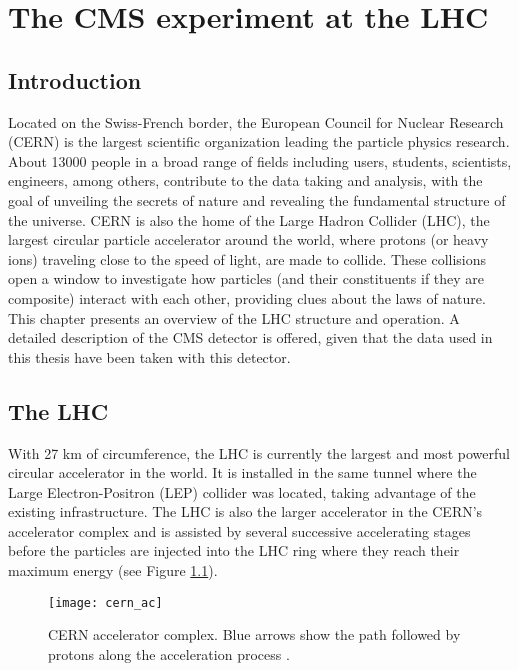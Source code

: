 \setcounter{chapter}{2}
\chapter{The CMS experiment at the LHC}\label{ch:cms}

\section{Introduction}\label{sec:cms_intro}
\noindent Located on the Swiss-French border, the European Council for Nuclear Research (CERN) is the largest scientific organization leading the particle physics research. About 13000 people in a broad range of fields including users, students, scientists, engineers, among others, contribute to the data taking and analysis, with the goal of unveiling the secrets of nature and revealing the fundamental structure of the universe. CERN is also the home of the Large Hadron Collider (LHC), the largest circular particle accelerator around the world, where protons (or heavy ions) traveling close to the speed of light, are made to collide. These collisions open a window to investigate how particles (and their constituents if they are composite) interact with each other, providing clues about the laws of nature. This chapter presents an overview of the LHC structure and operation. A detailed description of the CMS detector is offered, given that the data used in this thesis have been taken with this detector.     

\section{The LHC}\label{sec:lhc}

\noindent With 27 km of circumference, the LHC is currently the largest and most powerful circular accelerator in the world. It is installed in the same tunnel where the Large Electron-Positron (LEP) collider was located, taking advantage of the existing infrastructure. The LHC is also the larger accelerator in the CERN's accelerator complex and is assisted by several successive accelerating stages before the particles are injected into the LHC ring where they reach their maximum energy (see Figure \ref{fig:cern}).

\begin{figure}[!h]
  \centering
  \texttt{[image: cern\_ac]}
  \caption[CERN accelerator complex]{CERN accelerator complex. Blue arrows show the path followed by protons along the acceleration process \cite{cern}.}\label{fig:cern}
\end{figure}

